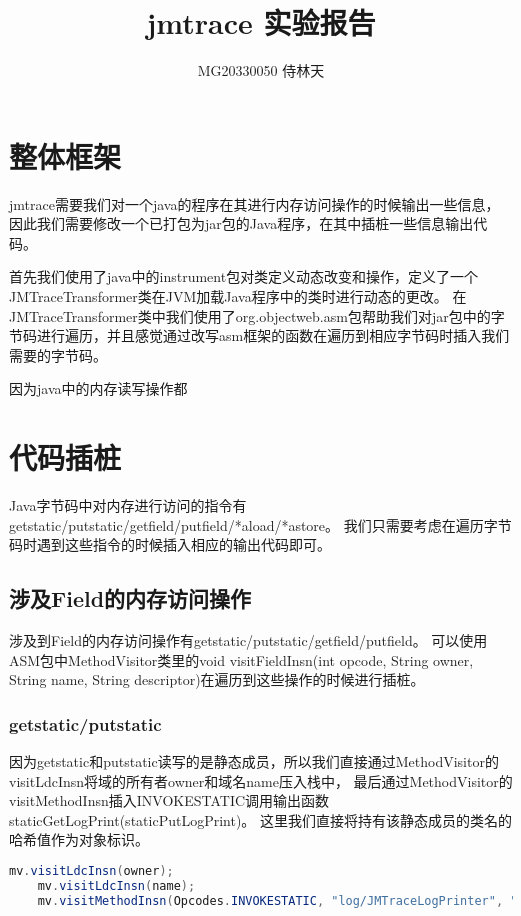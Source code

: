 \documentclass[UTF8]{article}
\begin{document}
\title{jmtrace 实验报告}

\author{MG20330050 侍林天}

\maketitle
\section{整体框架}
jmtrace需要我们对一个java的程序在其进行内存访问操作的时候输出一些信息，因此我们需要修改一个已打包为jar包的Java程序，在其中插桩一些信息输出代码。

首先我们使用了java中的instrument包对类定义动态改变和操作，定义了一个JMTraceTransformer类在JVM加载Java程序中的类时进行动态的更改。
在JMTraceTransformer类中我们使用了org.objectweb.asm包帮助我们对jar包中的字节码进行遍历，并且感觉通过改写asm框架的函数在遍历到相应字节码时插入我们需要的字节码。

因为java中的内存读写操作都

\section{代码插桩}
Java字节码中对内存进行访问的指令有getstatic/putstatic/getfield/putfield/*aload/*astore。
我们只需要考虑在遍历字节码时遇到这些指令的时候插入相应的输出代码即可。

\subsection{涉及Field的内存访问操作}
涉及到Field的内存访问操作有getstatic/putstatic/getfield/putfield。
可以使用ASM包中MethodVisitor类里的void visitFieldInsn(int opcode, String owner, String name, String descriptor)在遍历到这些操作的时候进行插桩。

\subsubsection{getstatic/putstatic}
因为getstatic和putstatic读写的是静态成员，所以我们直接通过MethodVisitor的visitLdcInsn将域的所有者owner和域名name压入栈中，
最后通过MethodVisitor的visitMethodInsn插入INVOKESTATIC调用输出函数staticGetLogPrint(staticPutLogPrint)。
这里我们直接将持有该静态成员的类名的哈希值作为对象标识。
\begin{lstlisting}[language=Java]
    mv.visitLdcInsn(owner);
    mv.visitLdcInsn(name);
    mv.visitMethodInsn(Opcodes.INVOKESTATIC, "log/JMTraceLogPrinter", "staticGetLogPrint", "(Ljava/lang/String;Ljava/lang/String;)V", false);
\end{lstlisting}
\end{document}
